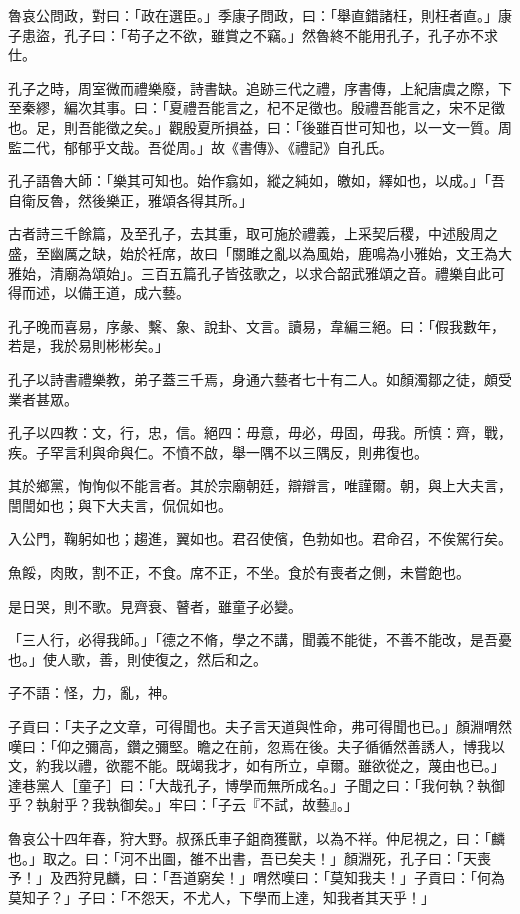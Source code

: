 \begin{pinyinscope}
魯哀公問政，對曰：「政在選臣。」季康子問政，曰：「舉直錯諸枉，則枉者直。」康子患盜，孔子曰：「苟子之不欲，雖賞之不竊。」然魯終不能用孔子，孔子亦不求仕。

孔子之時，周室微而禮樂廢，詩書缺。追跡三代之禮，序書傳，上紀唐虞之際，下至秦繆，編次其事。曰：「夏禮吾能言之，杞不足徵也。殷禮吾能言之，宋不足徵也。足，則吾能徵之矣。」觀殷夏所損益，曰：「後雖百世可知也，以一文一質。周監二代，郁郁乎文哉。吾從周。」故《書傳》、《禮記》自孔氏。

孔子語魯大師：「樂其可知也。始作翕如，縱之純如，皦如，繹如也，以成。」「吾自衛反魯，然後樂正，雅頌各得其所。」

古者詩三千餘篇，及至孔子，去其重，取可施於禮義，上采契后稷，中述殷周之盛，至幽厲之缺，始於衽席，故曰「關雎之亂以為風始，鹿鳴為小雅始，文王為大雅始，清廟為頌始」。三百五篇孔子皆弦歌之，以求合韶武雅頌之音。禮樂自此可得而述，以備王道，成六藝。

孔子晚而喜易，序彖、繫、象、說卦、文言。讀易，韋編三絕。曰：「假我數年，若是，我於易則彬彬矣。」

孔子以詩書禮樂教，弟子蓋三千焉，身通六藝者七十有二人。如顏濁鄒之徒，頗受業者甚眾。

孔子以四教：文，行，忠，信。絕四：毋意，毋必，毋固，毋我。所慎：齊，戰，疾。子罕言利與命與仁。不憤不啟，舉一隅不以三隅反，則弗復也。

其於鄉黨，恂恂似不能言者。其於宗廟朝廷，辯辯言，唯謹爾。朝，與上大夫言，誾誾如也；與下大夫言，侃侃如也。

入公門，鞠躬如也；趨進，翼如也。君召使儐，色勃如也。君命召，不俟駕行矣。

魚餒，肉敗，割不正，不食。席不正，不坐。食於有喪者之側，未嘗飽也。

是日哭，則不歌。見齊衰、瞽者，雖童子必變。

「三人行，必得我師。」「德之不脩，學之不講，聞義不能徙，不善不能改，是吾憂也。」使人歌，善，則使復之，然后和之。

子不語：怪，力，亂，神。

子貢曰：「夫子之文章，可得聞也。夫子言天道與性命，弗可得聞也已。」顏淵喟然嘆曰：「仰之彌高，鑽之彌堅。瞻之在前，忽焉在後。夫子循循然善誘人，博我以文，約我以禮，欲罷不能。既竭我才，如有所立，卓爾。雖欲從之，蔑由也已。」達巷黨人［童子］曰：「大哉孔子，博學而無所成名。」子聞之曰：「我何執？執御乎？執射乎？我執御矣。」牢曰：「子云『不試，故藝』。」

魯哀公十四年春，狩大野。叔孫氏車子鉏商獲獸，以為不祥。仲尼視之，曰：「麟也。」取之。曰：「河不出圖，雒不出書，吾已矣夫！」顏淵死，孔子曰：「天喪予！」及西狩見麟，曰：「吾道窮矣！」喟然嘆曰：「莫知我夫！」子貢曰：「何為莫知子？」子曰：「不怨天，不尤人，下學而上達，知我者其天乎！」


\end{pinyinscope}
